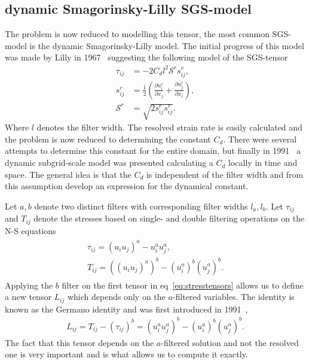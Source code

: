 \subsection{dynamic Smagorinsky-Lilly SGS-model}
The problem is now reduced to modelling this tensor, the most common SGS-model is the 
dynamic Smagorinsky-Lilly model. The initial progress of this model was made by 
Lilly in 1967~\cite{Lilly67} suggesting the following model of the SGS-tensor
%
\begin{align}
    \tau_{ij} &= -2C_dl^2\mathcal{S}^rs_{ij}^r,\\
    s^r_{ij} &= \frac{1}{2}\left( \frac{\partial u^r_i}{\partial x_j} +
    \frac{\partial u^r_j}{\partial x_i}\right),\\
    \mathcal{S}^r &= \sqrt{2s^r_{ij}s^r_{ij}}.
    \label{eq:boussinesq}
\end{align}
%
Where $l$ denotes the filter width.
The resolved strain rate is easily calculated and the problem is now reduced to determining
the constant $C_d$. There were several attempts to determine this constant for the entire domain,
but finally in 1991~\cite{Germano91} a dynamic subgrid-scale model was presented calculating a 
$C_d$ locally in time and space. The general idea is that the $C_d$ is independent of the 
filter width and from this assumption develop an expression for the dynamical constant.

Let $a,b$ denote two distinct filters with corresponding filter widths $l_a,l_b$. 
Let $\tau_{ij}$ and $T_{ij}$ denote the stresses based on single- and double filtering
operations on the N-S equations
\begin{align}
    \begin{split}
    \tau_{ij} = (u_iu_j)^a - u_i^au_j^a,\\
    T_{ij} = ((u_iu_j)^a)^b - (u_i^a)^b(u_j^a)^b.
    \end{split}
    \label{eq:stresstensors}
\end{align}
Applying the $b$ filter on the first tensor in eq~\ref{eq:stresstensors} allows us to define 
a new tensor $L_{ij}$ which depends only on the $a$-filtered variables. The identity 
is known as the Germano identity and was first introduced in 1991~\cite{Germano91},
\begin{align}
    L_{ij} = T_{ij} - (\tau_{ij})^b
    = (u_i^au_j^a)^b - (u_i^a)^b(u_j^a)^b.
    \label{eq:germanoid}
\end{align}
The fact that this tensor depends on the $a$-filtered solution and not the resolved 
one is very important and is what allows us to compute it exactly.

